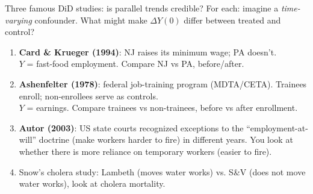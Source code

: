 \documentclass[xcolor=dvipsnames]{beamer}
\newtheorem{esti}{Estimator}
\begin{document}
\begin{frame}{Three famous DiD studies: is parallel trends credible?}
\footnotesize
For each: imagine a \textit{time-varying} confounder. What might make $\Delta Y(0)$ differ between treated and control?
\medskip
\begin{enumerate}
\item<1-> \textbf{Card \& Krueger (1994)}: NJ raises its minimum wage; PA doesn't.\\
  $Y$ = fast-food employment. Compare NJ vs PA, before/after.
\medskip
\item<2-> \textbf{Ashenfelter (1978)}: federal job-training program (MDTA/CETA). Trainees enroll; non-enrollees serve as controls.\\
  $Y$ = earnings. Compare trainees vs non-trainees, before vs after enrollment.
\medskip
\item<3-> \textbf{Autor (2003)}: US state courts recognized exceptions to the ``employment-at-will'' doctrine (make workers harder to fire) in different years. You look at whether there is more reliance on temporary workers (easier to fire). 
\medskip
\item<4-> Snow's cholera study: Lambeth (moves water works) vs. S\&V (does not move water works), look at cholera mortality. 
\end{enumerate}
\end{frame}

\end{document}
